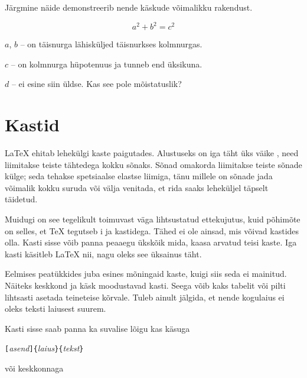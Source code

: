 \noindent Järgmine näide demonstreerib nende käskude võimalikku
rakendust.

\begin{example}
\newenvironment{muutkirj}[1]{%
  \settowidth{\parindent}{#1:\ }
  \makebox[0pt][r]{#1:\ }}{}
\begin{displaymath}
a^2+b^2=c^2
\end{displaymath}

\begin{muutkirj}{Kus}$a$, $b$ --
on täisnurga lähisküljed
täisnurkses kolmnurgas.

$c$ -- on kolmnurga hüpotenuus
ja tunneb end üksikuna.

$d$ -- ei esine siin üldse.
Kas see pole mõistatuslik?
\end{muutkirj}
\end{example}
\enlargethispage{\baselineskip}

\section{Kastid}

\LaTeX{} ehitab lehekülgi kaste paigutades. Alustuseks on iga täht üks
väike , need liimitakse teiste tähtedega kokku sõnaks. Sõnad
omakorda liimitakse teiste sõnade külge; seda tehakse spetsiaalse
elastse liimiga, tänu millele on sõnade jada võimalik kokku suruda või
välja venitada, et rida saaks leheküljel täpselt täidetud.

Muidugi on see tegelikult toimuvast väga lihtsustatud ettekujutus, kuid
põhimõte on selles, et \TeX{} tegutseb i ja kastidega. Tähed ei
ole ainsad, mis võivad kastides olla. Kasti sisse võib panna peaaegu
ükskõik mida, kaasa arvatud teisi kaste. Iga kasti käsitleb \LaTeX{}
nii, nagu oleks see üksainus täht.

Eelmises peatükkides juba esines mõningaid kaste, kuigi siis seda ei
mainitud. Näiteks keskkond  ja käsk 
moodustavad kasti. Seega võib kaks tabelit või pilti
lihtsasti asetada teineteise kõrvale. Tuleb ainult jälgida, et nende
kogulaius ei oleks teksti laiusest suurem.

Kasti sisse saab panna ka suvalise lõigu kas käsuga

\begin{lscommand}
\verb|[|\emph{asend}\verb|]{|\emph{laius}\verb|}{|\emph{tekst}\verb|}|
\end{lscommand}

\noindent või keskkonnaga


